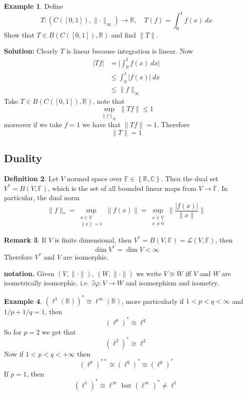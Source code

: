 \documentclass[11pt,a4paper]{article}
\theoremstyle{definition}
\newtheorem{definition}{Definition}[section]
\newtheorem{example}[definition]{Example}
\newtheorem{remark}[definition]{Remark}
\theoremstyle{plain}
\theoremstyle{remark}
\newcommand{\F}{\mathbb{F}}
\newcommand{\R}{\mathbb{R}}
\newcommand{\C}{\mathbb{C}}
\renewcommand{\set}[1]{\left\{ #1 \right\}}
\newcommand{\abs}[1]{\lvert #1 \rvert}
\newcommand{\norm}[1]{\lVert #1 \rVert}
\newcommand{\1}{\mathbbm{1}}
\begin{document}
\begin{example}
    Define 
    $$T \colon \left(C([0,1]), \norm{\cdot}_\infty\right) \to \R, \quad T (f) = \int_{0}^1 f(x) \ dx$$
    Show that $T \in B(C([0,1]), \R)$ and find $\norm{T}$.

    \textbf{Solution:} Clearly $T$ is linear because integration is linear. Now 
    \begin{align*}
        \abs{Tf} &= \abs{\int_0^1 f(x) \ dx} \\
        &\le \int_0^1 \abs{f(x)} \ dx \\
        &\le \norm{f}_\infty
    \end{align*}
    Take $T \in B(C([0,1]), \R)$, note that 
    $$\sup_{\norm{f}_\infty} \norm{Tf} \le 1$$
    moreover if we take $f = 1$ we have that $\norm{Tf} = 1$. Therefore 
    $$\norm{T} = 1$$
\end{example}

\subsection{Duality} 

\begin{definition}
    Let $V$ normed space over $\F \in \set{\R, \C}$. Then the dual set $V^* = B(V,\F)$, which is the set of all bounded linear maps from $V \to \F$.
    In particular, the dual norm 
    $$\norm{f}_* = \sup_{\substack{x \in V \\ \norm{x} = 1}} \norm{f(x)} = \sup_{\substack{x \in V \\ x \ne 0}} \norm{\frac{\abs{f(x)}}{\norm{x}}}$$
\end{definition}

\begin{remark}
    If $V$ is finite dimensional, then $V^* = B(V, \F) = \mathcal{L}(V,\F)$, then 
    $$\dim V^* = \dim V < \infty$$
    Therefore $V^*$ and $V$ are isomorphic. 
\end{remark}

\textbf{notation.} Given $(V, \norm{\cdot}), \ (W, \norm{\cdot})$ we write $V \cong W$ iff $V$ and $W$ are isometrically isomorphic. i.e. $\exists \varphi \colon V \to W$ and isomorphism and isometry.

\begin{example}
    $(\ell^1 (\R))^* \cong \ell^\infty(\R)$, more particularly if $1 < p < q < \infty$ and $1/p + 1/q = 1$, then 
    $$(\ell^p)^* \cong \ell^q$$
    So for $p = 2$ we get that 
    $$(\ell^2)^* \cong \ell^2$$
    Now if $1 < p < q < + \infty$  then 
    $$(\ell^p)^{**} \cong (\ell^q)^* \cong (\ell^p)^*$$
    If $p = 1$, then 
    $$(\ell^1)^* \cong \ell^\infty \text{ but } (\ell^\infty)^* \ne \ell^1$$
\end{example}
\end{document}
